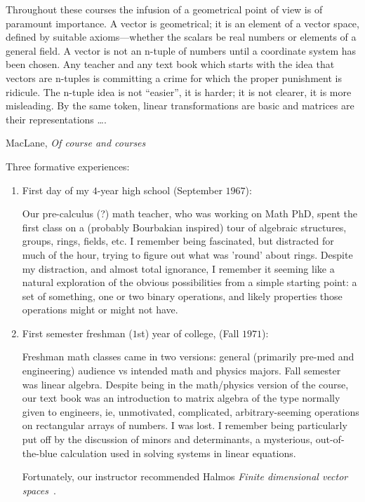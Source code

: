 \documentclass[11pt]{book}
\begin{document}
\epigraph{Throughout these courses the infusion of a geometrical
point of view is of paramount importance. A vector
is geometrical; it is an element of a vector space, defined
by suitable axioms—whether the scalars be real numbers or
elements of a general field. A vector is not an n-tuple of
numbers until a coordinate system has been chosen. Any
teacher and any text book which starts with the idea that vectors
are n-tuples is committing a crime for which the proper
punishment is ridicule. The n-tuple idea is not ``easier'', it is
harder; it is not clearer, it is more misleading. By the same
token, linear transformations are basic and matrices are their
representations {\ldots}.}
{MacLane, \textit{Of course and courses}~\cite{maclane1954}}

Three formative experiences:
\begin{enumerate}
  \item First day of my $4$-year high school (September $1967$):
  \par
  Our pre-calculus (?) math teacher, who was working on Math PhD,
  spent the first class on a (probably Bourbakian inspired) tour 
  of algebraic structures, groups, rings, fields, etc.
  I remember being fascinated, but distracted for much of the hour, 
  trying to figure out what was 'round' about rings.
  Despite my distraction, and almost total ignorance, 
  I remember it seeming like a natural exploration of the obvious
  possibilities from a simple starting point: a set of something,
  one or two binary operations, and likely properties those
  operations might or might not have.
 
  \item First semester freshman ($1$st) year of college,
  (Fall $1971$):
  \par
  Freshman math classes came in two versions: 
  general (primarily pre-med and engineering) audience
  vs intended math and physics majors. Fall semester was linear 
  algebra. Despite being in the math/physics version of the course,
  our text book was an introduction to matrix algebra of the type
  normally given to engineers, ie, unmotivated, complicated,
  arbitrary-seeming operations on rectangular arrays of numbers.
  I was lost. I remember being particularly put off by the 
  discussion of minors and determinants, a mysterious, 
  out-of-the-blue calculation used in solving systems in linear
  equations.
  \par
  Fortunately, our instructor recommended 
  Halmos \textit{Finite dimensional vector 
  spaces}~\cite{halmos1958finite}. 
  

\end{enumerate}
\end{document}
